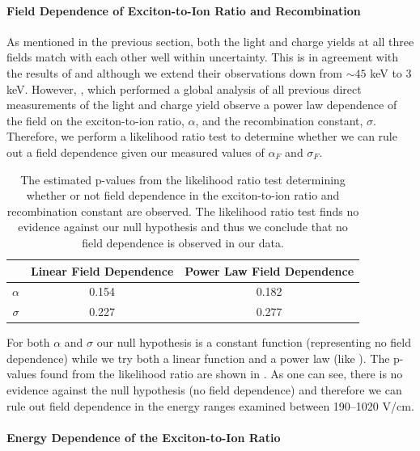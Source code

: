 \paragraph{Field Dependence of Exciton-to-Ion Ratio and Recombination}

As mentioned in the previous section, both the light and charge yields at all three fields match with each other well within uncertainty.  This is in agreement with the results of  and  although we extend their observations down from $\sim 45$ keV to 3 keV.  However, , which performed a global analysis of all previous direct measurements of the light and charge yield observe a power law dependence of the field on the exciton-to-ion ratio, $\alpha$, and the recombination constant, $\sigma$.  Therefore, we perform a likelihood ratio test to determine whether we can rule out a field dependence given our measured values of $\alpha_F$ and $\sigma_F$.


\begin{table}[t]
\centering
\def\arraystretch{1.22}
\begin{tabular}{c|cc}
 & Linear Field Dependence & Power Law Field Dependence \\
\hline
$\alpha$ & 0.154 & 0.182 \\
$\sigma$ & 0.227 & 0.277 \\
\end{tabular}
\caption{The estimated p-values from the likelihood ratio test determining whether or not field dependence in the exciton-to-ion ratio and recombination constant are observed.  The likelihood ratio test finds no evidence against our null hypothesis and thus we conclude that no field dependence is observed in our data.}
\label{tab:nerix_field_dependence}
\end{table}


For both $\alpha$ and $\sigma$ our null hypothesis is a constant function (representing no field dependence) while we try both a linear function and a power law (like ).  The p-values found from the likelihood ratio are shown in .  As one can see, there is no evidence against the null hypothesis (no field dependence) and therefore we can rule out field dependence in the energy ranges examined between 190--1020 V/cm.


\paragraph{Energy Dependence of the Exciton-to-Ion Ratio}

